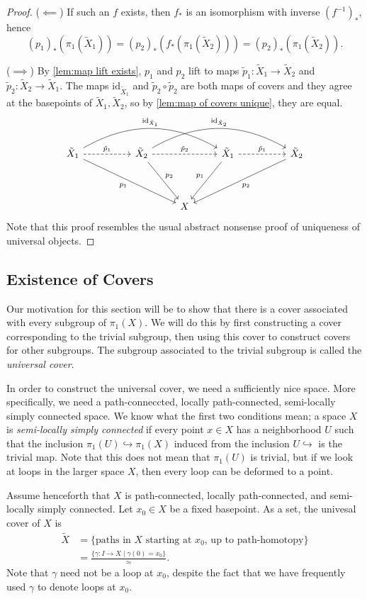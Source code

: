\documentclass{article}
\theoremstyle{definition}
\theoremstyle{remark}
\numberwithin{figure}{section}
\begin{document}
\begin{proof}
	($\impliedby$) If such an $f$ exists, then $f_*$ is an isomorphism with inverse $(f^{-1})_*$, hence
	\[
	(p_1)_*(\pi_1(\tilde X_1)) = (p_2)_*(f_*(\pi_1(\tilde X_2))) = (p_2)_*(\pi_1(\tilde X_2)).
	\]
	
	($\implies$) By \cref{lem:map lift exists}, $p_1$ and $p_2$ lift to maps $\tilde p_1 : \tilde X_1 \to \tilde X_2$ and $\tilde p_2 : \tilde X_2 \to \tilde X_1$. The maps $\mathrm{id}_{\tilde X_1}$ and $\tilde p_2 \circ \tilde p_2$ are both maps of covers and they agree at the basepoints of $\tilde X_1, \tilde X_2$, so by \cref{lem:map of covers unique}, they are equal.
	\[
	\begin{tikzcd}
		\tilde X_1 \ar[drrr, "p_1"'] \ar[rr, dashed, "\tilde p_1"] \ar[rrrr, bend left, "\mathrm{id}_{\tilde X_1}"] && \tilde X_2 \ar[dr, "p_2"] \ar[rr, dashed, "\tilde p_2"] \ar[rrrr, bend left, "\mathrm{id}_{\tilde X_2}"] && \tilde X_1 \ar[dl, "p_1"'] \ar[rr, dashed, "\tilde p_1"] && \tilde X_2 \ar[dlll, "p_2"]\\[2em]
		&&& X
	\end{tikzcd}
	\]
	Note that this proof resembles the usual abstract nonsense proof of uniqueness of universal objects.
\end{proof}

\subsection{Existence of Covers}
Our motivation for this section will be to show that there is a cover associated with every subgroup of $\pi_1(X)$. We will do this by first constructing a cover corresponding to the trivial subgroup, then using this cover to construct covers for other subgroups. The subgroup associated to the trivial subgroup is called the \emph{universal cover}.

In order to construct the universal cover, we need a sufficiently nice space. More specifically, we need a path-conneccted, locally path-connected, semi-locally simply connected space. We know what the first two conditions mean; a space $X$ is \emph{semi-locally simply connected} if every point $x \in X$ has a neighborhood $U$ such that the inclusion $\pi_1(U) \hookrightarrow \pi_1(X)$ induced from the inclusion $U \hookrightarrow$ is the trivial map. Note that this does not mean that $\pi_1(U)$ is trivial, but if we look at loops in the larger space $X$, then every loop can be deformed to a point.

Assume henceforth that $X$ is path-connected, locally path-connected, and semi-locally simply connected. Let $x_0 \in X$ be a fixed basepoint. As a set, the univesal cover of $X$ is
\begin{align*}
	\tilde X &= \{ \text{paths in } X \text{ starting at } x_0 \text{, up to path-homotopy}\}\\
	&= \frac{\{ \gamma : I \to X \mid \gamma(0) = x_0 \}}{\simeq}.
\end{align*}
Note that $\gamma$ need not be a loop at $x_0$, despite the fact that we have frequently used $\gamma$ to denote loops at $x_0$.
\end{document}

